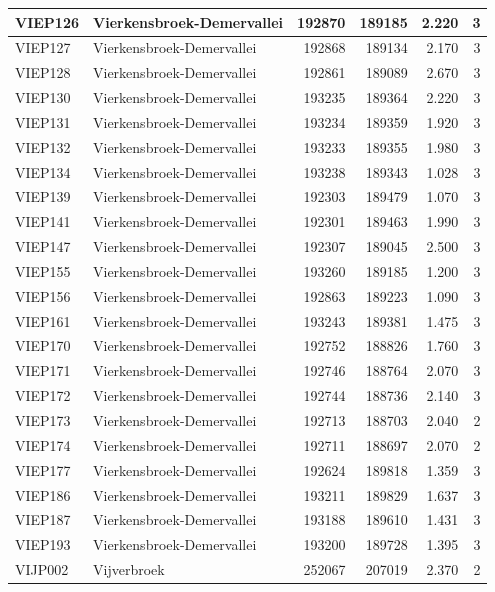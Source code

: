 \documentclass[11pt,]{book}
\begin{document}
\begin{table}
\begin{tabular}[t]{l|l|r|r|r|r}
\hline
VIEP126 & Vierkensbroek-Demervallei & 192870 & 189185 & 2.220 & 3\\
\hline
VIEP127 & Vierkensbroek-Demervallei & 192868 & 189134 & 2.170 & 3\\
\hline
VIEP128 & Vierkensbroek-Demervallei & 192861 & 189089 & 2.670 & 3\\
\hline
VIEP130 & Vierkensbroek-Demervallei & 193235 & 189364 & 2.220 & 3\\
\hline
VIEP131 & Vierkensbroek-Demervallei & 193234 & 189359 & 1.920 & 3\\
\hline
VIEP132 & Vierkensbroek-Demervallei & 193233 & 189355 & 1.980 & 3\\
\hline
VIEP134 & Vierkensbroek-Demervallei & 193238 & 189343 & 1.028 & 3\\
\hline
VIEP139 & Vierkensbroek-Demervallei & 192303 & 189479 & 1.070 & 3\\
\hline
VIEP141 & Vierkensbroek-Demervallei & 192301 & 189463 & 1.990 & 3\\
\hline
VIEP147 & Vierkensbroek-Demervallei & 192307 & 189045 & 2.500 & 3\\
\hline
VIEP155 & Vierkensbroek-Demervallei & 193260 & 189185 & 1.200 & 3\\
\hline
VIEP156 & Vierkensbroek-Demervallei & 192863 & 189223 & 1.090 & 3\\
\hline
VIEP161 & Vierkensbroek-Demervallei & 193243 & 189381 & 1.475 & 3\\
\hline
VIEP170 & Vierkensbroek-Demervallei & 192752 & 188826 & 1.760 & 3\\
\hline
VIEP171 & Vierkensbroek-Demervallei & 192746 & 188764 & 2.070 & 3\\
\hline
VIEP172 & Vierkensbroek-Demervallei & 192744 & 188736 & 2.140 & 3\\
\hline
VIEP173 & Vierkensbroek-Demervallei & 192713 & 188703 & 2.040 & 2\\
\hline
VIEP174 & Vierkensbroek-Demervallei & 192711 & 188697 & 2.070 & 2\\
\hline
VIEP177 & Vierkensbroek-Demervallei & 192624 & 189818 & 1.359 & 3\\
\hline
VIEP186 & Vierkensbroek-Demervallei & 193211 & 189829 & 1.637 & 3\\
\hline
VIEP187 & Vierkensbroek-Demervallei & 193188 & 189610 & 1.431 & 3\\
\hline
VIEP193 & Vierkensbroek-Demervallei & 193200 & 189728 & 1.395 & 3\\
\hline
VIJP002 & Vijverbroek & 252067 & 207019 & 2.370 & 2\\

\end{tabular}
\end{table}
\end{document}

